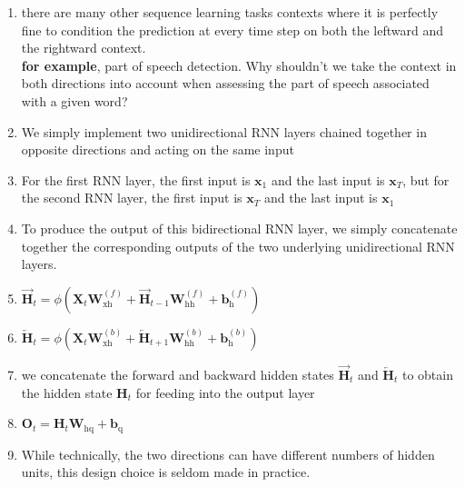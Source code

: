 \begin{enumerate}[itemsep=0.15cm]
    \item there are many other sequence learning tasks contexts where it is perfectly fine to condition the prediction at every time step on both the leftward and the rightward context.\\
    \textbf{for example}, part of speech detection. Why shouldn’t we take the context in both directions into account when assessing the part of speech associated with a given word?

    \item We simply implement two unidirectional RNN layers chained together in opposite directions and acting on the same input

    \item For the first RNN layer, the first input is $\mathbf{x}_1$ and the last input is $\mathbf{x}_T$, but for the second RNN layer, the first input is $\mathbf{x}_T$ and the last input is $\mathbf{x}_1$

    \item To produce the output of this bidirectional RNN layer, we simply concatenate together the corresponding outputs of the two underlying unidirectional RNN layers.

    \item $\overrightarrow{\mathbf{H}}_t = \phi(\mathbf{X}_t \mathbf{W}_{\textrm{xh}}^{(f)} + \overrightarrow{\mathbf{H}}_{t-1} \mathbf{W}_{\textrm{hh}}^{(f)}  + \mathbf{b}_\textrm{h}^{(f)})$

    \item $\overleftarrow{\mathbf{H}}_t = \phi(\mathbf{X}_t \mathbf{W}_{\textrm{xh}}^{(b)} + \overleftarrow{\mathbf{H}}_{t+1} \mathbf{W}_{\textrm{hh}}^{(b)}  + \mathbf{b}_\textrm{h}^{(b)})$

    \item we concatenate the forward and backward hidden states $\overrightarrow{\mathbf{H}}_t$ and $\overleftarrow{\mathbf{H}}_t$ to obtain the hidden state $\mathbf{H}_t$ for feeding into the output layer

    \item $\mathbf{O}_t = \mathbf{H}_t \mathbf{W}_{\textrm{hq}} + \mathbf{b}_\textrm{q}$

    \item While technically, the two directions can have different numbers of hidden units, this design choice is seldom made in practice.

\end{enumerate}























